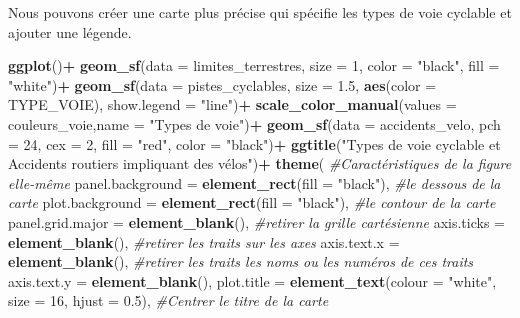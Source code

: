 \documentclass[
  12pt,
]{krantz}
\newenvironment{Shaded}{\begin{snugshade}}{\end{snugshade}}
\newcommand{\CommentTok}[1]{\textcolor[rgb]{0.56,0.35,0.01}{\textit{#1}}}
\newcommand{\DataTypeTok}[1]{\textcolor[rgb]{0.13,0.29,0.53}{#1}}
\newcommand{\DecValTok}[1]{\textcolor[rgb]{0.00,0.00,0.81}{#1}}
\newcommand{\FloatTok}[1]{\textcolor[rgb]{0.00,0.00,0.81}{#1}}
\newcommand{\KeywordTok}[1]{\textcolor[rgb]{0.13,0.29,0.53}{\textbf{#1}}}
\newcommand{\NormalTok}[1]{#1}
\newcommand{\OperatorTok}[1]{\textcolor[rgb]{0.81,0.36,0.00}{\textbf{#1}}}
\newcommand{\StringTok}[1]{\textcolor[rgb]{0.31,0.60,0.02}{#1}}
\begin{document}
Nous pouvons créer une carte plus précise qui spécifie les types de voie cyclable et ajouter une légende.

\begin{Shaded}
\begin{Highlighting}[]
\KeywordTok{ggplot}\NormalTok{()}\OperatorTok{+}
\StringTok{  }\KeywordTok{geom_sf}\NormalTok{(}\DataTypeTok{data =}\NormalTok{ limites_terrestres, }\DataTypeTok{size =} \DecValTok{1}\NormalTok{, }\DataTypeTok{color =} \StringTok{"black"}\NormalTok{, }\DataTypeTok{fill =} \StringTok{"white"}\NormalTok{)}\OperatorTok{+}
\StringTok{  }\KeywordTok{geom_sf}\NormalTok{(}\DataTypeTok{data =}\NormalTok{ pistes_cyclables, }\DataTypeTok{size =} \FloatTok{1.5}\NormalTok{, }\KeywordTok{aes}\NormalTok{(}\DataTypeTok{color =}\NormalTok{ TYPE_VOIE),  }\DataTypeTok{show.legend =} \StringTok{"line"}\NormalTok{)}\OperatorTok{+}
\StringTok{  }\KeywordTok{scale_color_manual}\NormalTok{(}\DataTypeTok{values =}\NormalTok{ couleurs_voie,}\DataTypeTok{name =} \StringTok{"Types de voie"}\NormalTok{)}\OperatorTok{+}
\StringTok{  }\KeywordTok{geom_sf}\NormalTok{(}\DataTypeTok{data =}\NormalTok{ accidents_velo, }\DataTypeTok{pch =} \DecValTok{24}\NormalTok{, }\DataTypeTok{cex =} \DecValTok{2}\NormalTok{, }\DataTypeTok{fill =} \StringTok{"red"}\NormalTok{, }\DataTypeTok{color =} \StringTok{"black"}\NormalTok{)}\OperatorTok{+}
\StringTok{  }\KeywordTok{ggtitle}\NormalTok{(}\StringTok{"Types de voie cyclable et Accidents routiers impliquant des vélos"}\NormalTok{)}\OperatorTok{+}
\KeywordTok{theme}\NormalTok{(}
      \CommentTok{#Caractéristiques de la figure elle-même}
      \DataTypeTok{panel.background =} \KeywordTok{element_rect}\NormalTok{(}\DataTypeTok{fill =} \StringTok{"black"}\NormalTok{), }\CommentTok{#le dessous de la carte}
      \DataTypeTok{plot.background =} \KeywordTok{element_rect}\NormalTok{(}\DataTypeTok{fill =} \StringTok{"black"}\NormalTok{),  }\CommentTok{#le contour de la carte}
      \DataTypeTok{panel.grid.major =} \KeywordTok{element_blank}\NormalTok{(),              }\CommentTok{#retirer la grille cartésienne}
      \DataTypeTok{axis.ticks =} \KeywordTok{element_blank}\NormalTok{(),                    }\CommentTok{#retirer les traits sur les axes}
      \DataTypeTok{axis.text.x =} \KeywordTok{element_blank}\NormalTok{(),                   }\CommentTok{#retirer les traits les noms ou les numéros de ces traits}
      \DataTypeTok{axis.text.y =} \KeywordTok{element_blank}\NormalTok{(),}
      \DataTypeTok{plot.title =} \KeywordTok{element_text}\NormalTok{(}\DataTypeTok{colour =} \StringTok{"white"}\NormalTok{, }\DataTypeTok{size =} \DecValTok{16}\NormalTok{, }\DataTypeTok{hjust =} \FloatTok{0.5}\NormalTok{), }\CommentTok{#Centrer le titre de la carte}

\end{Highlighting}
\end{Shaded}
\end{document}
